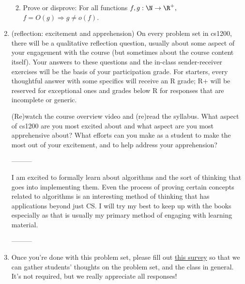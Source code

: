 \documentclass[11pt]{article}
\begin{document}
\begin{enumerate}
\begin{enumerate}
\begin{enumerate}
        \smallskip

    \end{enumerate}

    \item Prove or disprove: For all functions $f,g : \N\rightarrow \R^+,$ $f=O(g) \Rightarrow g\neq o(f)$.
\end{enumerate}

\item (reflection: excitement and apprehension)  On every problem set in cs1200, there will be a qualitative reflection question, usually about some aspect of your engagement with the course (but sometimes about the course content itself). Your answers to these questions and the in-class sender-receiver exercises will be the basis of your participation grade.  For starters, every thoughtful answer with some specifics will receive an R grade; R+ will be reserved for exceptional ones and grades below R for responses that are incomplete or generic.

(Re)watch the course overview video and (re)read the syllabus.  What aspect of cs1200 are you most excited about and what aspect are you most apprehensive about?  What efforts can you make as a student to make the most out of your excitement, and to help address your apprehension?

\smallskip

---------

I am excited to formally learn about algorithms and the sort of thinking that goes into implementing them. Even the process of proving certain concepts related to algorithms is an interesting method of thinking
that has applications beyond just CS. I will try my best to keep up with the books especially as that is usually my primary method of engaging with learning material.

---------

\smallskip

\item Once you're done with this problem set, please fill out \href{https://forms.gle/yLptjrB15sRm1c679}{this survey} so that we can gather students' thoughts on the problem set, and the class in general. It's not required, but we really appreciate all responses!
\end{enumerate}
\end{document}
